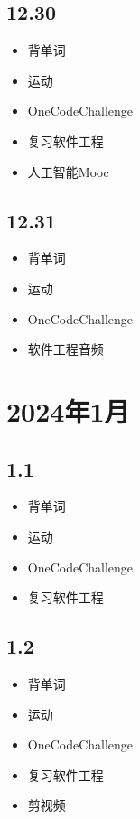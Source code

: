\documentclass[UTF8]{ctexart}
\begin{document}
\subsection*{12.30}
\begin{itemize}
    \item 背单词
    \item 运动
    \item OneCodeChallenge
    \item 复习软件工程
    \item 人工智能Mooc
\end{itemize}

\subsection*{12.31}
\begin{itemize}
    \item 背单词
    \item 运动
    \item OneCodeChallenge
    \item 软件工程音频
\end{itemize}

\section*{2024年1月}

\subsection*{1.1}
\begin{itemize}
    \item 背单词
    \item 运动
    \item OneCodeChallenge
    \item 复习软件工程
\end{itemize}

\subsection*{1.2}
\begin{itemize}
    \item 背单词
    \item 运动
    \item OneCodeChallenge
    \item 复习软件工程
    \item 剪视频
\end{itemize}
\end{document}
